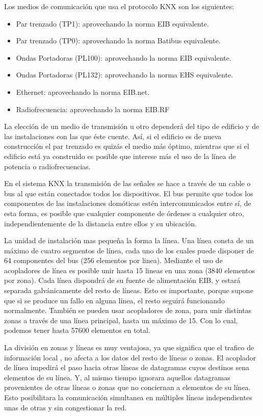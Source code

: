 Los medios de comunicación que usa el protocolo KNX son los siguientes: 
\begin{itemize}
	\item Par trenzado (TP1): aprovechando la norma EIB equivalente.
	\item Par trenzado (TP0): aprovechando la norma Batibus equivalente. 
	\item Ondas Portadoras (PL100): aprovechando la norma EIB equivalente.
	\item Ondas Portadoras (PL132): aprovechando la norma EHS equivalente. 
	\item Ethernet: aprovechando la norma EIB.net. 
	\item Radiofrecuencia: aprovechando la norma EIB.RF
\end{itemize}
La elección de un medio de transmisión u otro depender\'a del tipo de edificio y de las instalaciones con las que éste cuente. Así, si el edificio es de nueva construcción el par trenzado es quiz\'as el medio m\'as óptimo, mientras que si el edificio est\'a ya construido es posible que interese m\'as el uso de la línea de potencia o radiofrecuencias.


En el sistema KNX la transmisión de las señales se hace a través de un cable o bus al que est\'an conectados todos los dispositivos. El bus permite que todos los componentes de las instalaciones domóticas estén intercomunicados entre sí, de esta forma, es posible que cualquier componente de órdenes a cualquier otro, independientemente de la distancia entre ellos y su ubicación. 


La unidad de instalación mas pequeña la forma la línea. Una línea consta de un m\'aximo de cuatro segmentos de línea, cada uno de los cuales puede disponer de 64 componentes del bus (256 elementos por linea). Mediante el uso de acopladores de línea es posible unir hasta 15 lineas en una zona (3840 elementos por zona). Cada línea dispondr\'a de su fuente de alimentación EIB, y estar\'a separada galv\'anicamente del resto de líneas. Esto es importante, porque supone que si se produce un fallo en alguna línea, el resto seguir\'a funcionando normalmente. También se pueden usar acopladores de zona, para unir distintas zonas a través de una línea principal, hasta un m\'aximo de 15. Con lo cual, podemos tener hasta 57600 elementos en total.

La división en zonas y líneas es muy ventajosa, ya que significa que el trafico de información local , no afecta a los datos del resto de líneas o zonas. El acoplador de línea impedir\'a el paso hacia otras líneas de datagramas cuyos destinos sena elementos de su línea. Y, al mismo tiempo ignorara aquellos datagramas provenientes de otras líneas o zonas que no conciernan a elementos de su línea. Esto posibilitara la comunicación simultanea en múltiples líneas independientes unas de otras y sin congestionar la red.


